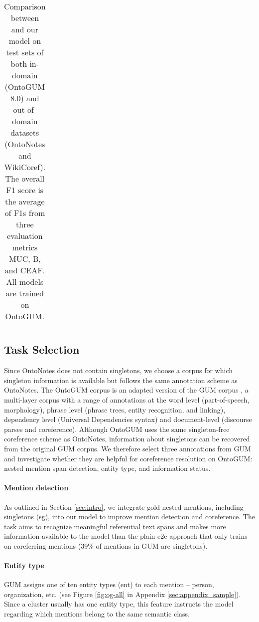 \documentclass[11pt]{article}
\begin{document}
\begin{table*}[t!hb]
{\begin{tabular}{l|ccc|ccccccccc|c}
    \bottomrule
    \end{tabular}
    }
    \caption{Comparison between \citet{DBLP:journals/corr/abs-1907-10529} and our model on test sets of both in-domain (OntoGUM 8.0) and out-of-domain datasets (OntoNotes and WikiCoref). The overall F1 score is the average of F1s from three evaluation metrics MUC, B, and CEAF. All models are trained on OntoGUM.}
    \label{tab:res}
\end{table*}







\subsection{Task Selection}
Since OntoNotes does not contain singletons, we choose a corpus for which singleton information is available but follows the same annotation scheme as OntoNotes. The OntoGUM corpus \citep{zhu-etal-2021-ontogum} is an adapted version of the GUM corpus \cite{Zeldes2017}, a multi-layer corpus with a range of annotations at the word level (part-of-speech, morphology), phrase level (phrase trees, entity recognition, and linking), dependency level (Universal Dependencies syntax) and document-level (discourse parses and coreference). Although OntoGUM uses the same singleton-free coreference scheme as OntoNotes, information about singletons can be recovered from the original GUM corpus. We therefore select three annotations from GUM and investigate whether they are helpful for coreference resolution on OntoGUM: nested mention span detection, entity type, and information status.

\vspace{-0.2em}
\paragraph{Mention detection} As outlined in Section \ref{sec:intro}, we integrate gold nested mentions, including singletons (sg), into our model to improve mention detection and coreference. The task aims to recognize meaningful referential text spans and makes more information available to the model than the plain e2e approach that only trains on coreferring mentions (39\% of mentions in GUM are singletons). 

\vspace{-0.2em}
\paragraph{Entity type} GUM assigns one of ten entity types (ent) to each mention -- person, organization, etc. (see Figure \ref{fig:og-all} in Appendix \ref{sec:appendix_sample}). Since a cluster usually has one entity type, this feature instructs the model regarding which mentions belong to the same semantic class.
\end{document}
